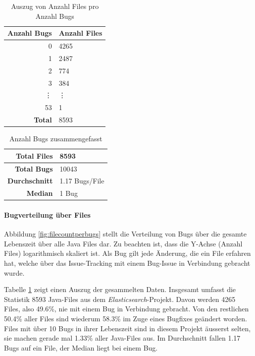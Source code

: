 \documentclass[10pt, a4paper]{article}
\begin{document}
\begin{table}[!ht]
	\begin{tabular}[c]{|r|l|}
		\hline
		\textbf{Anzahl Bugs} & \textbf{Anzahl Files} \\
		\hline
		0 & 4265\\
		1 & 2487\\
		2 & 774\\
		3 & 384\\
		\vdots & \vdots \\
		53 & 1 \\
		\hline
		\textbf{Total} & 8593 \\
		\hline
	\end{tabular}
	\centering
	\caption{Auszug von Anzahl Files pro Anzahl Bugs}
	\label{tab:filecountperbugs}
\end{table}

\begin{table}[!ht]
	\begin{tabular}[c]{|r|l|}
		\hline
		\textbf{Total Files} & 8593 \\
		\hline
		\textbf{Total Bugs} & 10043 \\
		\hline
		\textbf{Durchschnitt} & 1.17 Bugs/File \\
		\hline
		\textbf{Median} & 1 Bug \\
		\hline
	\end{tabular}
	\centering
	\caption{Anzahl Bugs zusammengefasst}
	\label{tab:filecountperbugs_summary}
\end{table}

\paragraph{Bugverteilung über Files} Abbildung \ref{fig:filecountperbugs} stellt die Verteilung von Bugs über die gesamte Lebenszeit über alle Java Files dar. Zu beachten ist, dass die Y-Achse (Anzahl Files) logarithmisch skaliert ist. Als Bug gilt jede Änderung, die ein File erfahren hat, welche über das Issue-Tracking mit einem Bug-Issue in Verbindung gebracht wurde.

Tabelle \ref{tab:filecountperbugs} zeigt einen Auszug der gesammelten Daten. Insgesamt umfasst die Statistik 8593 Java-Files aus dem \emph{Elasticsearch}-Projekt. Davon werden 4265 Files, also 49.6\%, nie mit einem Bug in Verbindung gebracht. Von den restlichen 50.4\% aller Files sind wiederum 58.3\% im Zuge eines Bugfixes geändert worden. Files mit über 10 Bugs in ihrer Lebenszeit sind in diesem Projekt äusserst selten, sie machen gerade mal 1.33\% aller Java-Files aus. Im Durchschnitt fallen 1.17 Bugs auf ein File, der Median liegt bei einem Bug.
\end{document}
